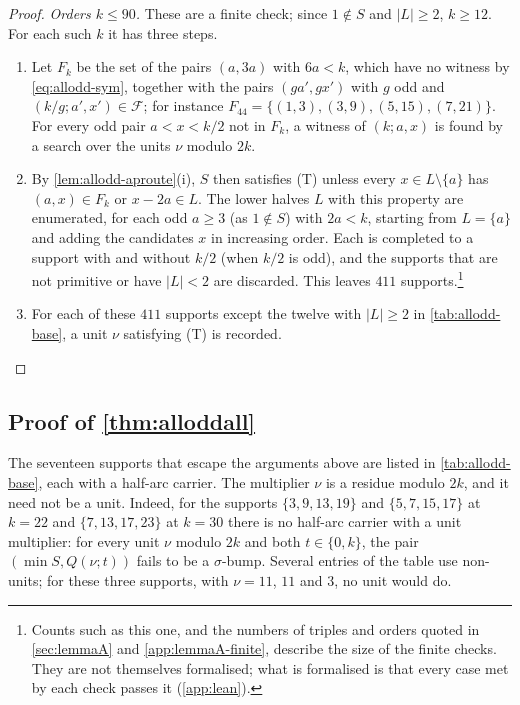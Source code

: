 \begin{proof}
\emph{Orders $k\le90$.} These are a finite check; since
$1\notin S$ and $|L|\ge2$, $k\ge12$. For each such $k$ it has three steps.
\begin{enumerate}
\item Let $F_k$ be the set of the pairs $(a,3a)$ with $6a<k$, which have no
witness by \eqref{eq:allodd-sym}, together with the pairs $(ga',gx')$ with
$g$ odd and $(k/g;a',x')\in\mathcal F$; for instance
$F_{44}=\{(1,3),(3,9),(5,15),(7,21)\}$. For every odd pair $a<x<k/2$ not in
$F_k$, a witness of $(k;a,x)$ is found by a search over the units $\nu$ modulo $2k$.
\item By \autoref{lem:allodd-aproute}(i), $S$ then satisfies (T) unless
every $x\in L\setminus\{a\}$ has $(a,x)\in F_k$ or $x-2a\in L$. The lower
halves $L$ with this property are enumerated, for each odd $a\ge3$ (as
$1\notin S$) with $2a<k$, starting from $L=\{a\}$ and adding the
candidates $x$ in increasing order. Each is completed to a support with and without $k/2$
(when $k/2$ is odd), and the supports that are not primitive or have
$|L|<2$ are discarded. This leaves $411$ supports.\footnote{Counts such as
this one, and the numbers of triples and orders quoted in
\autoref{sec:lemmaA} and \autoref{app:lemmaA-finite}, describe the size of
the finite checks. They are not themselves formalised; what is formalised is
that every case met by each check passes it (\autoref{app:lean}).}
\item For each of these $411$ supports except the twelve with $|L|\ge2$ in
\autoref{tab:allodd-base}, a unit $\nu$ satisfying (T) is recorded.
\end{enumerate}
\end{proof}

\subsection{Proof of \autoref{thm:alloddall}}
\label{sec:allodd-proof}

The seventeen supports that escape the arguments above are listed in
\autoref{tab:allodd-base}, each with a half-arc carrier. The multiplier $\nu$
is a residue modulo $2k$, and it need not be a unit. Indeed, for the supports
$\{3,9,13,19\}$ and $\{5,7,15,17\}$ at $k=22$ and $\{7,13,17,23\}$ at
$k=30$ there is no half-arc carrier with a unit multiplier: for every unit
$\nu$ modulo $2k$ and both $t\in\{0,k\}$, the pair $(\min S,Q(\nu;t))$ fails
to be a $\sigma$-bump. Several entries of the table use non-units; for these
three supports, with $\nu=11$, $11$ and $3$, no unit would do.

